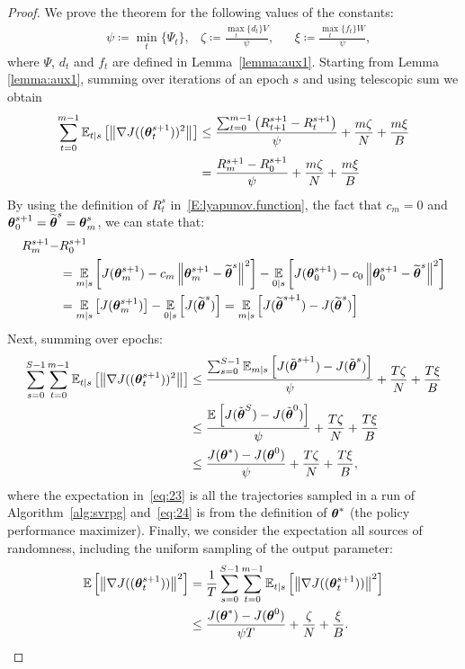 \begin{proof}
	We prove the theorem for the following values of the constants:
	\begin{align*}
	& \psi \coloneqq \min_t\{\Psi_t\}, 
	& \zeta \coloneqq \frac{\max_t\{d_t\}V}{\psi}, 
	&& \xi \coloneqq \frac{\max_t\{f_t\}W}{\psi},
	\end{align*}
	where $\Psi$, $d_t$ and $f_t$ are defined in Lemma~\ref{lemma:aux1}.
	Starting from Lemma \ref{lemma:aux1}, summing over iterations of an epoch $s$ and using telescopic sum we obtain
	\begin{align*}
	\sum_{t=0}^{m-1}\Ets{\norm[]{\gradJ{(\vtheta_t^{s+1})}^2}}&\leq
	\frac{\sum_{t=0}^{m-1}\left(R_{t+1}^{s+1} - R_t^{s+1}\right)}{\psi} + \frac{m\zeta}{N} + \frac{m\xi}{B} \nonumber\\
	& = \frac{R^{s+1}_m - R^{s+1}_0}{\psi}  + \frac{m\zeta}{N} + \frac{m\xi}{B}
	\end{align*}
	By using the definition of $R^s_t$ in~\eqref{E:lyapunov.function}, the fact that $c_m = 0$ and $\vtheta^{s+1}_0 = \wt{\vtheta}^s = \vtheta^s_m$, we can state that:
	\begin{align*}
	R^{s+1}_m - &R^{s+1}_0 \\
	& = \EVV[m|s]{J(\vtheta^{s+1}_{m})- c_m \norm[]{\vtheta^{s+1}_{m} - \wt{\vtheta}^s}^2 } - \EVV[0|s]{J(\vtheta^{s+1}_{0}) - c_0 \norm[]{\vtheta^{s+1}_0 - \wt{\vtheta}^s}^2}\\
	&= \EVV[m|s]{J(\vtheta^{s+1}_{m})} - \EVV[0|s]{J(\wt{\vtheta}^s)}
	= \EVV[m|s]{J(\wt{\vtheta}^{s+1}) - J(\wt{\vtheta}^s)}
	\end{align*}
	Next, summing over epochs:
	\begin{align}
	\sum_{s=0}^{S-1}\sum_{t=0}^{m-1}\Ets{\norm[]{\gradJ{(\vtheta_t^{s+1})}^2}}&\leq
	\frac{\sum_{s=0}^{S-1}\Ets[m]{J(\tilde{\vtheta}^{s+1}) - J(\tilde{\vtheta}^{s})}}{\psi} + \frac{T\zeta}{N} + \frac{T\xi}{B} \nonumber\\
	&\leq
	\frac{\EVV[]{J(\tilde{\vtheta}^{S}) - J(\tilde{\vtheta}^{0})}}{\psi} + \frac{T\zeta}{N} + \frac{T\xi}{B}
	\label{eq:23}\\
	&\leq
	\frac{J(\vtheta^*) - J(\vtheta^0)}{\psi} + \frac{T\zeta}{N} + \frac{T\xi}{B}, \label{eq:24}
	\end{align}
	where the expectation in~\eqref{eq:23} is \wrt all the trajectories sampled in a run of Algorithm~\ref{alg:svrpg} and~\eqref{eq:24} is from the definition of $\vtheta^*$ (\ie the policy performance maximizer).
	Finally, we consider the expectation \wrt all sources of randomness, including the uniform sampling of the output parameter:
	\begin{align*}
	\EVV[]{\norm[]{\gradJ{(\vtheta_t^{s+1})}}^2} 
	&=\frac{1}{T}\sum_{s=0}^{S-1}\sum_{t=0}^{m-1}\Ets{\norm[]{\gradJ{(\vtheta_t^{s+1})}}^2} \\
	&\leq
	\frac{J(\vtheta^*) - J(\vtheta^0)}{\psi T} + \frac{\zeta}{N} + \frac{\xi}{B}.
	\end{align*}
 \end{proof}

